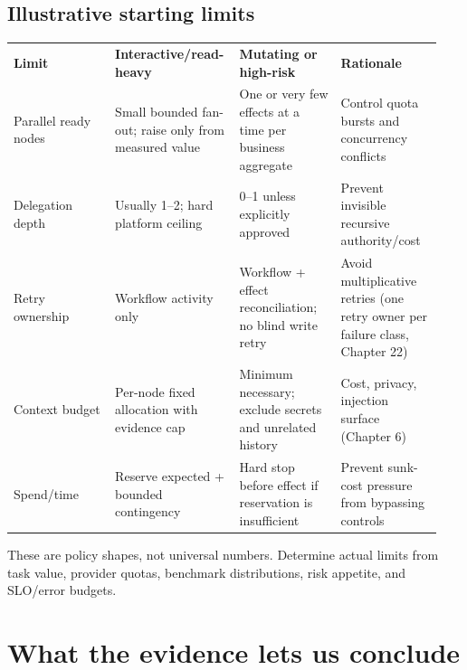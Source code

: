 \subsection{Illustrative starting limits}

\BookTableStart
\fontsize{7.2}{9}\selectfont
\begin{tabular}{@{}Y{0.2350\linewidth}Y{0.2350\linewidth}Y{0.2350\linewidth}Y{0.2350\linewidth}@{}}
\color{white}\bfseries \textbf{Limit} & \color{white}\bfseries \textbf{Interactive/read-heavy} & \color{white}\bfseries \textbf{Mutating or high-risk} & \color{white}\bfseries \textbf{Rationale} \\
Parallel ready nodes & Small bounded fan-out; raise only from measured value & One or very few effects at a time per business aggregate & Control quota bursts and concurrency conflicts \\
Delegation depth & Usually 1–2; hard platform ceiling & 0–1 unless explicitly approved & Prevent invisible recursive authority/cost \\
Retry ownership & Workflow activity only & Workflow + effect reconciliation; no blind write retry & Avoid multiplicative retries (one retry owner per failure class, Chapter 22) \\
Context budget & Per-node fixed allocation with evidence cap & Minimum necessary; exclude secrets and unrelated history & Cost, privacy, injection surface (Chapter 6) \\
Spend/time & Reserve expected + bounded contingency & Hard stop before effect if reservation is insufficient & Prevent sunk-cost pressure from bypassing controls \\
\end{tabular}
\BookTableEnd

These are policy shapes, not universal numbers. Determine actual limits from task value, provider quotas, benchmark distributions, risk appetite, and SLO/error budgets.\par

\section{What the evidence lets us conclude}

